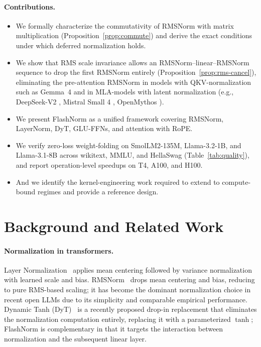 \documentclass{article}
\begin{document}
\paragraph{Contributions.}
\begin{itemize}
  \item We formally characterize the commutativity of RMSNorm with
        matrix multiplication (Proposition~\ref{prop:commute}) and derive
        the exact conditions under which deferred normalization holds.
  \item We show that RMS scale invariance allows an RMSNorm--linear--RMSNorm
        sequence to drop the first RMSNorm entirely (Proposition~\ref{prop:rms-cancel}),
        eliminating the pre-attention RMSNorm in models with QKV-normalization \citep{qkv-norm}
        such as Gemma~4 \citep{gemma4} and in MLA-models with latent normalization
        (e.g., DeepSeek-V2 \citep{deepseek-v2},
        Mistral Small 4 \citep{mistral4}, OpenMythos \citep{openMythos}).
  \item We present FlashNorm as a unified framework covering RMSNorm, LayerNorm,
        DyT, GLU-FFNs, and attention with RoPE.
  \item We verify zero-loss weight-folding on SmolLM2-135M, Llama-3.2-1B, and
        Llama-3.1-8B across wikitext, MMLU, and HellaSwag (Table~\ref{tab:quality}),
        and report operation-level speedups on T4, A100, and H100.
  \item And we identify the kernel-engineering work required to extend to
        compute-bound regimes and provide a reference design.
\end{itemize}

\section{Background and Related Work}

\paragraph{Normalization in transformers.}
Layer Normalization~\citep{layerNorm} applies mean centering followed by
variance normalization with learned scale and bias. RMSNorm~\citep{rms}
drops mean centering and bias, reducing to pure RMS-based scaling; it has become the
dominant normalization choice in recent open LLMs due to its simplicity and
comparable empirical performance. Dynamic Tanh (DyT)~\citep{DyT} is a
recently proposed drop-in replacement that eliminates the normalization computation
entirely, replacing it with a parameterized $\tanh$; FlashNorm is complementary in
that it targets the interaction between normalization and the subsequent linear layer.
\end{document}
